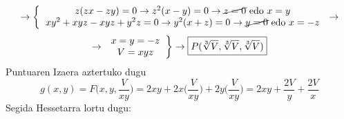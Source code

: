 \begin{equation*}
\rightarrow
  \left\{
  \begin{tabular}{ c }
    $z(zx-zy)=0 \rightarrow z^2(x-y)=0 \rightarrow \cancel{z=0} \text{ edo } x=y$ \\
    $xy^2 + xyz -xyz +y^2z=0 \rightarrow y^2(x+z)=0 \rightarrow \cancel{y=0} \text{ edo } x=-z$ \\
  \end{tabular}
  \right.
  \rightarrow
\end{equation*}
\begin{equation*}
 \rightarrow
 \left.
 \begin{tabular}{ c }
    $x=y=-z$ \\
    $V=xyz$ \\
  \end{tabular}
  \right\}
  \rightarrow
   \boxed{P(\sqrt[3]{V}, \sqrt[3]{V}, \sqrt[3]{V})}
\end{equation*}
\centering Puntuaren Izaera aztertuko dugu 
\newpage
\begin{equation*}
    \boxed{g(x,y) = F\Bigg(x,y,\frac{V}{xy}\Bigg)} = 2xy + 2x\Bigg(\frac{V}{xy}\Bigg) + 2y\Bigg(\frac{V}{xy}\Bigg)= 2xy + \frac{2V}{y} + \frac{2V}{x}
\end{equation*}
Segida Hessetarra lortu dugu:
